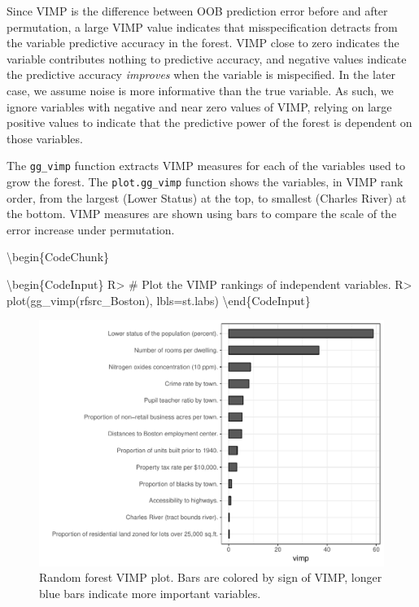 \documentclass[article]{jss}
\begin{document}
Since VIMP is the difference between OOB prediction error before and
after permutation, a large VIMP value indicates that misspecification
detracts from the variable predictive accuracy in the forest. VIMP close
to zero indicates the variable contributes nothing to predictive
accuracy, and negative values indicate the predictive accuracy
\emph{improves} when the variable is mispecified. In the later case, we
assume noise is more informative than the true variable. As such, we
ignore variables with negative and near zero values of VIMP, relying on
large positive values to indicate that the predictive power of the
forest is dependent on those variables.

The \texttt{gg\_vimp} function extracts VIMP measures for each of the
variables used to grow the forest. The \texttt{plot.gg\_vimp} function
shows the variables, in VIMP rank order, from the largest (Lower Status)
at the top, to smallest (Charles River) at the bottom. VIMP measures are
shown using bars to compare the scale of the error increase under
permutation.

\textbackslash{}begin\{CodeChunk\}

\textbackslash{}begin\{CodeInput\} R\textgreater{} \# Plot the VIMP
rankings of independent variables. R\textgreater{}
plot(gg\_vimp(rfsrc\_Boston), lbls=st.labs)
\textbackslash{}end\{CodeInput\}

\begin{figure}

{\centering \includegraphics{Regression-rfsrc_files/figure-latex/vimp-1} 

}

\caption[Random forest VIMP plot]{Random forest VIMP plot. Bars are colored by sign of VIMP, longer blue bars indicate more important variables.}\label{fig:vimp}
\end{figure}
\end{document}

